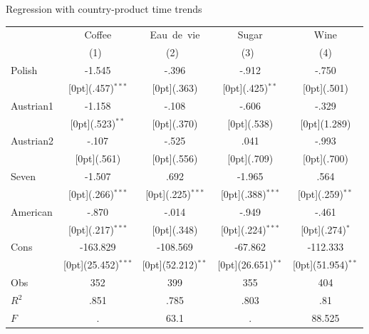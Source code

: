 \documentclass[12pt,a4paper,titlepage]{article}
\begin{document}
{\newpage
\caption{Regression with country-product time trends}
\begin{tabular*}{\textwidth}{@{\extracolsep{\fill}}lcccc}				
	& \multicolumn{1}{c}{Coffee} &	\multicolumn{1}{c}{Eau~de~vie} &	\multicolumn{1}{c}{Sugar} &	\multicolumn{1}{c}{Wine} \\
\cline{2-5}				
	& \multicolumn{1}{c}{(1)\mbox{\ }} &	\multicolumn{1}{c}{(2)\mbox{\ }} &	\multicolumn{1}{c}{(3)\mbox{\ }} &	\multicolumn{1}{c}{(4)} \\
\hline				
Polish &	-1.545 &	-.396 &	-.912 &	-.750 \\
&	\raisebox{.7ex}[0pt]{\scriptsize (.457)$^{***}$} &	\raisebox{.7ex}[0pt]{\scriptsize (.363)} &	\raisebox{.7ex}[0pt]{\scriptsize (.425)$^{**}$} &	\raisebox{.7ex}[0pt]{\scriptsize (.501)} \\
Austrian1 &	-1.158 &	-.108 &	-.606 &	-.329 \\
&	\raisebox{.7ex}[0pt]{\scriptsize (.523)$^{**}$} &	\raisebox{.7ex}[0pt]{\scriptsize (.370)} &	\raisebox{.7ex}[0pt]{\scriptsize (.538)} &	\raisebox{.7ex}[0pt]{\scriptsize (1.289)} \\
Austrian2 &	-.107 &	-.525 &	.041 &	-.993 \\
&	\raisebox{.7ex}[0pt]{\scriptsize (.561)} &	\raisebox{.7ex}[0pt]{\scriptsize (.556)} &	\raisebox{.7ex}[0pt]{\scriptsize (.709)} &	\raisebox{.7ex}[0pt]{\scriptsize (.700)} \\
Seven &	-1.507 &	.692 &	-1.965 &	.564 \\
&	\raisebox{.7ex}[0pt]{\scriptsize (.266)$^{***}$} &	\raisebox{.7ex}[0pt]{\scriptsize (.225)$^{***}$} &	\raisebox{.7ex}[0pt]{\scriptsize (.388)$^{***}$} &	\raisebox{.7ex}[0pt]{\scriptsize (.259)$^{**}$} \\
American &	-.870 &	-.014 &	-.949 &	-.461 \\
&	\raisebox{.7ex}[0pt]{\scriptsize (.217)$^{***}$} &	\raisebox{.7ex}[0pt]{\scriptsize (.348)} &	\raisebox{.7ex}[0pt]{\scriptsize (.224)$^{***}$} &	\raisebox{.7ex}[0pt]{\scriptsize (.274)$^{*}$} \\
Cons &	-163.829 &	-108.569 &	-67.862 &	-112.333 \\
&	\raisebox{.7ex}[0pt]{\scriptsize (25.452)$^{***}$} &	\raisebox{.7ex}[0pt]{\scriptsize (52.212)$^{**}$} &	\raisebox{.7ex}[0pt]{\scriptsize (26.651)$^{**}$} &	\raisebox{.7ex}[0pt]{\scriptsize (51.954)$^{**}$} \\
Obs &	352 &	399 &	355 &	404 \\
$R^2$ &	.851 &	.785 &	.803 &	.81 \\
$F$ &	. &	63.1 &	. &	88.525 \\
\hline\hline				
\end{tabular*}%

}
\end{document}
